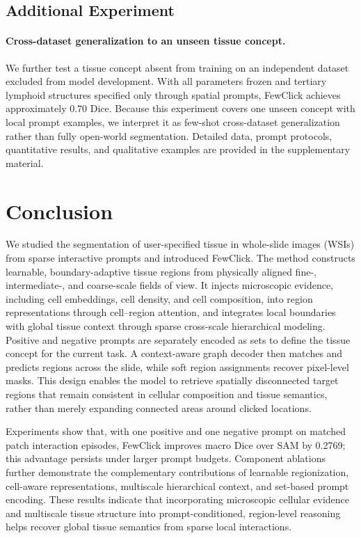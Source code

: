 \documentclass[letterpaper]{article}
\begin{document}
\subsection{Additional Experiment}
\paragraph{Cross-dataset generalization to an unseen tissue concept.}
We further test a tissue concept absent from training on an independent dataset excluded from model development. With all parameters frozen and tertiary lymphoid structures specified only through spatial prompts, FewClick achieves approximately $0.70$ Dice. Because this experiment covers one unseen concept with local prompt examples, we interpret it as few-shot cross-dataset generalization rather than fully open-world segmentation. Detailed data, prompt protocols, quantitative results, and qualitative examples are provided in the supplementary material.

\FloatBarrier

\section{Conclusion}
We studied the segmentation of user-specified tissue in whole-slide images (WSIs) from sparse interactive prompts and introduced FewClick. The method constructs learnable, boundary-adaptive tissue regions from physically aligned fine-, intermediate-, and coarse-scale fields of view. It injects microscopic evidence, including cell embeddings, cell density, and cell composition, into region representations through cell--region attention, and integrates local boundaries with global tissue context through sparse cross-scale hierarchical modeling. Positive and negative prompts are separately encoded as sets to define the tissue concept for the current task. A context-aware graph decoder then matches and predicts regions across the slide, while soft region assignments recover pixel-level masks. This design enables the model to retrieve spatially disconnected target regions that remain consistent in cellular composition and tissue semantics, rather than merely expanding connected areas around clicked locations.

Experiments show that, with one positive and one negative prompt on matched patch interaction episodes, FewClick improves macro Dice over SAM by 0.2769; this advantage persists under larger prompt budgets. Component ablations further demonstrate the complementary contributions of learnable regionization, cell-aware representations, multiscale hierarchical context, and set-based prompt encoding. These results indicate that incorporating microscopic cellular evidence and multiscale tissue structure into prompt-conditioned, region-level reasoning helps recover global tissue semantics from sparse local interactions.
\end{document}
